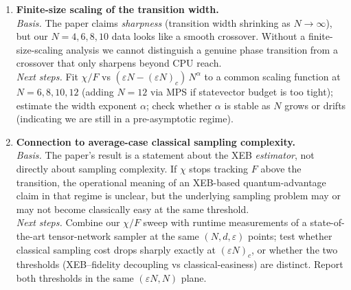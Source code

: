 \begin{enumerate}
\item \textbf{Finite-size scaling of the transition width.}\\
\emph{Basis.} The paper claims \emph{sharpness} (transition width shrinking as $N\to\infty$),
but our $N=4,6,8,10$ data looks like a smooth crossover. Without a finite-size-scaling analysis
we cannot distinguish a genuine phase transition from a crossover that only sharpens beyond
CPU reach.\\
\emph{Next steps.} Fit $\chi/F$ vs $(\varepsilon N - (\varepsilon N)_c)\,N^{\alpha}$ to a common
scaling function at $N=6,8,10,12$ (adding $N=12$ via MPS if statevector budget is too tight);
estimate the width exponent $\alpha$; check whether $\alpha$ is stable as $N$ grows or drifts
(indicating we are still in a pre-asymptotic regime).

\item \textbf{Connection to average-case classical sampling complexity.}\\
\emph{Basis.} The paper's result is a statement about the XEB \emph{estimator}, not directly
about sampling complexity. If $\chi$ stops tracking $F$ above the transition, the operational
meaning of an XEB-based quantum-advantage claim in that regime is unclear, but the underlying
sampling problem may or may not become classically easy at the same threshold.\\
\emph{Next steps.} Combine our $\chi/F$ sweep with runtime measurements of a state-of-the-art
tensor-network sampler at the same $(N,d,\varepsilon)$ points; test whether classical sampling
cost drops sharply exactly at $(\varepsilon N)_c$, or whether the two thresholds
(XEB--fidelity decoupling vs classical-easiness) are distinct. Report both thresholds in the
same $(\varepsilon N, N)$ plane.

\end{enumerate}
